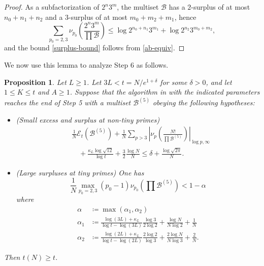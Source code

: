 \documentclass[12pt,a4paper,reqno]{amsart}
\numberwithin{equation}{section}
\theoremstyle{plain}
\newtheorem{proposition}[theorem]{Proposition}
\theoremstyle{definition}
\newcommand\tuple{{\mathcal B}}
\newcommand\excess{{\mathcal{E}}}
\begin{document}
\begin{proof}
  As a subfactorization of $2^n 3^m$, the multiset $\tuple$ has a $2$-surplus of at most $n_0+n_1+n_2$ and a $3$-surplus of at most $m_0+m_2+m_1$, hence
  $$ \sum_{p_0=2,3} \nu_{p_0}\left(\frac{2^n 3^m}{\prod \tuple}\right) \leq \log 2^{n_0+n_1} 3^{m_1} + \log 2^{n_2} 3^{m_0+m_2},$$
  and the bound \eqref{surplus-bound} follows from \eqref{ab-equiv}.
  \end{proof}
  
We now use this lemma to analyze Step 6 as follows.

\begin{proposition}\label{step6-reduce} Let $L \geq 1$.
  Let $3L < t = N/e^{1+\delta}$ for some $\delta>0$, and let $1 \leq K \leq t$ and $A \geq 1$.  Suppose that the algorithm in  with the indicated parameters reaches the end of Step 5 with a multiset $\tuple^{(5)}$ obeying the following hypotheses:
\begin{itemize}
  \item[(i)] (Small excess and surplus at non-tiny primes)
  \begin{equation}\label{new-balance-3}
  \begin{split}
    &\frac{1}{N} \excess_t(\tuple^{(5)}) + \frac{1}{N} \sum_{p>3} \left|\nu_p\left(\frac{N!}{\prod \tuple^{(5)}}\right)\right|_{\log p,\infty}  \\
    &\quad + \frac{\kappa_L \log \sqrt{12}}{\log t} + \frac{3}{2} \frac{\log N}{N} \leq \delta + \frac{\log \sqrt{2\pi}}{N}.
  \end{split}
  \end{equation}
  \item[(ii)] (Large surpluses at tiny primes) One has
\begin{equation}\label{qn} 
\frac{1}{N} \max_{p_0=2,3} (p_0-1) \nu_{p_0}\left(\prod \tuple^{(5)}\right) < 1-\alpha
\end{equation}
where 
\begin{equation}\label{qntl} 
  \begin{split}
\alpha &\coloneqq \max(\alpha_1,\alpha_2) \\
\alpha_1 &\coloneqq \frac{\log(3L)+\kappa_L}{\log t - \log(3L)} \frac{\log 3}{2 \log 2} + \frac{\log N}{N \log 2} + \frac{1}{N} \\
\alpha_2 &\coloneqq \frac{\log(2L)+\kappa_L}{\log t - \log(2L)} \frac{2\log 2}{\log 3} + \frac{2\log N}{N \log 3} + \frac{2}{N}.
  \end{split}
\end{equation}
\end{itemize}
Then $t(N) \geq t$.
\end{proposition}
\end{document}
